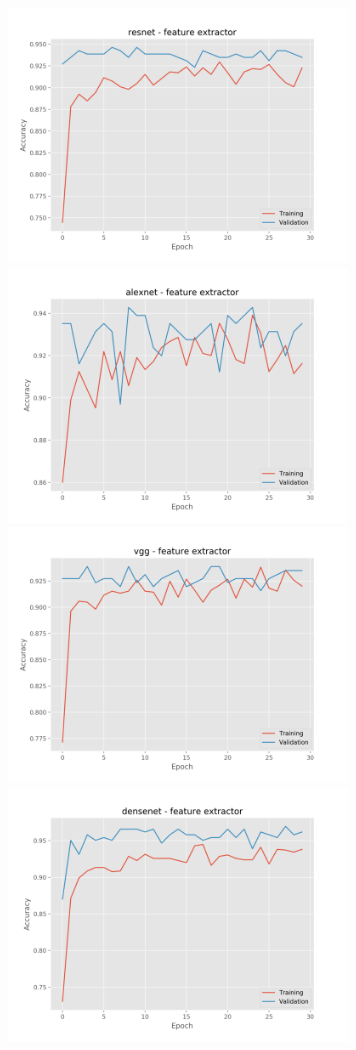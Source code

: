 \documentclass[]{kththesis}
\begin{document}
  \begin{figure}[h]
    \includegraphics[width=9cm]{b_a_resnet_fe}
    \includegraphics[width=9cm]{b_a_alexnet_fe}
    \includegraphics[width=9cm]{b_a_vgg_fe}
    \includegraphics[width=9cm]{b_a_densenet_fe}

\end{figure}
\end{document}
